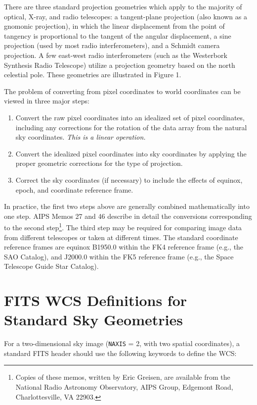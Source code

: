 There are three standard projection geometries which apply to the majority
of optical, X-ray, and radio telescopes:  a tangent-plane projection
(also known as a gnomonic projection), in which the linear displacement
from the point of tangency is proportional to the tangent of the angular
displacement, a sine projection (used by most radio interferometers), and
a Schmidt camera projection.  A few east-west radio interferometers
(such as the Westerbork Synthesis Radio Telescope) utilize a projection
geometry based on the north celestial pole.  These geometries are
illustrated in Figure 1.

The problem of converting from pixel coordinates to world coordinates
can be viewed in three major steps:

\begin{enumerate}
\item Convert the raw pixel coordinates into an idealized set of pixel
coordinates, including any corrections for the rotation of the data
array from the natural sky coordinates.  {\it This is a linear operation.}
\item Convert the idealized pixel coordinates into sky coordinates by
applying the proper geometric corrections for the type of projection.
\item Correct the sky coordinates (if necessary) to include the effects
of equinox, epoch, and coordinate reference frame.
\end{enumerate}

In practice, the first two steps above are generally combined mathematically
into one step.  AIPS Memos 27 and 46 describe in detail the conversions 
corresponding to the second step\footnote{Copies of these memos, written by Eric
Greisen, are available from the National Radio Astronomy Observatory, AIPS
Group, Edgemont Road, Charlottesville, VA 22903.}. The third step may be
required for comparing image data from different telescopes or taken at
different times.  The standard coordinate reference frames are equinox B1950.0
within the FK4 reference frame (e.g., the SAO Catalog), and J2000.0 within the
FK5 reference frame (e.g., the Space Telescope Guide Star Catalog). 


\section{FITS WCS Definitions for Standard Sky Geometries}
For a two-dimensional sky image ({\tt NAXIS} = 2, with two spatial 
coordinates), a standard FITS header should use the following keywords to
define the WCS: 

